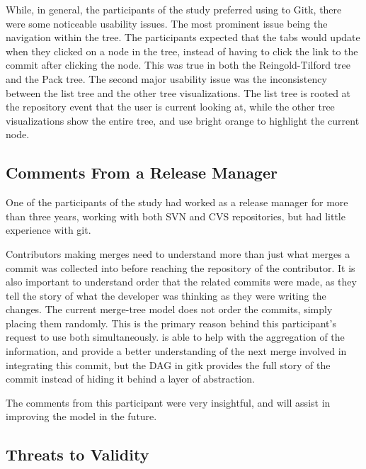 While, in general, the participants of the study preferred using \tool
to Gitk, there were some noticeable usability issues. The most prominent
issue being the navigation within the tree. The participants expected
that the tabs would update when they clicked on a node in the tree,
instead of having to click the link to the commit after clicking the
node. This was true in both the Reingold-Tilford tree and the Pack tree.
The second major usability issue was the inconsistency between the list
tree and the other tree visualizations. The list tree is rooted at the
repository event that the user is current looking at, while the other
tree visualizations show the entire tree, and use bright orange to
highlight the current node.


\subsection{Comments From a Release Manager}
\label{sub:comments_from_a_release_manager}

One of the participants of the study had worked as a release manager for
more than three years, working with both SVN and CVS repositories, but
had little experience with git.

Contributors making merges need to understand more than just what merges
a commit was collected into before reaching the repository of the
contributor. It is also important to understand order that the related
commits were made, as they tell the story of what the developer was
thinking as they were writing the changes. The current merge-tree model
does not order the commits, simply placing them randomly. This is the
primary reason behind this participant's request to use both
simultaneously. \tool is able to help with the aggregation of the
information, and provide a better understanding of the next merge
involved in integrating this commit, but the DAG in gitk provides the
full story of the commit instead of hiding it behind a layer of
abstraction.

The comments from this participant were very insightful, and will assist
in improving the model in the future.

\subsection{Threats to Validity}
\label{sub:threats}



